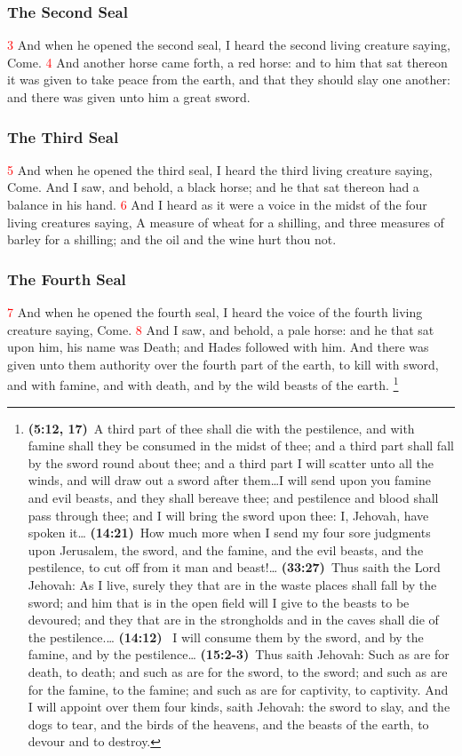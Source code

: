 \documentclass[12pt,twoside]{memoir}
\newcommand{\cbibleref}[3]{\textbf{\ibibleverse{#1}(#2)}\ {#3}}
\newcommand{\cbiblechvs}[3]{\textbf{\ibiblechvs{#1}(#2)}\ {#3}}
\newcommand{\vnum}[1]{\textcolor{red}{\normalsize{#1}}}
\begin{document}
\subsubsection*{The Second Seal}
\vnum{3} And when he opened the second seal, I heard the second living creature saying, Come. %
\vnum{4} And another horse came forth, a red horse: and to him that sat thereon it was given to take peace from the earth, and that they should slay one another: and there was given unto him a great sword.
\subsubsection*{The Third Seal}
\vnum{5} And when he opened the third seal, I heard the third living creature saying, Come. And I saw, and behold, a black horse; and he that sat thereon had a balance in his hand. \vnum{6} And I heard as it were a voice in the midst of the four living creatures saying, A measure of wheat for a shilling, and three measures of barley for a shilling; and the oil and the wine hurt thou not.
\subsubsection*{The Fourth Seal}
\vnum{7} And when he opened the fourth seal, I heard the voice of the fourth living creature saying, Come. %
\vnum{8} And I saw, and behold, a pale horse: and he that sat upon him, his name was Death; and Hades followed with him. And there was given unto them authority over the fourth part of the earth, to kill with sword, and with famine, and with death, and by the wild beasts of the earth.
	\footnote{\cbibleref{Ezekiel}{5:12, 17}{A third part of thee shall die with the pestilence, and with famine shall they be consumed in the midst of thee; and a third part shall fall by the sword round about thee; and a third part I will scatter unto all the winds, and will draw out a sword after them\ldots I will send upon you famine and evil beasts, and they shall bereave thee; and pestilence and blood shall pass through thee; and I will bring the sword upon thee: I, Jehovah, have spoken it}\ldots%
			\cbiblechvs{Ezekiel}{14:21}{How much more when I send my four sore judgments upon Jerusalem, the sword, and the famine, and the evil beasts, and the pestilence, to cut off from it man and beast!}\ldots%
			\cbiblechvs{Ezekiel}{33:27}{Thus saith the Lord Jehovah: As I live, surely they that are in the waste places shall fall by the sword; and him that is in the open field will I give to the beasts to be devoured; and they that are in the strongholds and in the caves shall die of the pestilence.}\ldots%
			\cbibleref{Jeremiah}{14:12}{ I will consume them by the sword, and by the famine, and by the pestilence}\ldots%
			\cbiblechvs{Jeremiah}{15:2-3}{Thus saith Jehovah: Such as are for death, to death; and such as are for the sword, to the sword; and such as are for the famine, to the famine; and such as are for captivity, to captivity. And I will appoint over them four kinds, saith Jehovah: the sword to slay, and the dogs to tear, and the birds of the heavens, and the beasts of the earth, to devour and to destroy.}
			}%
\end{document}
